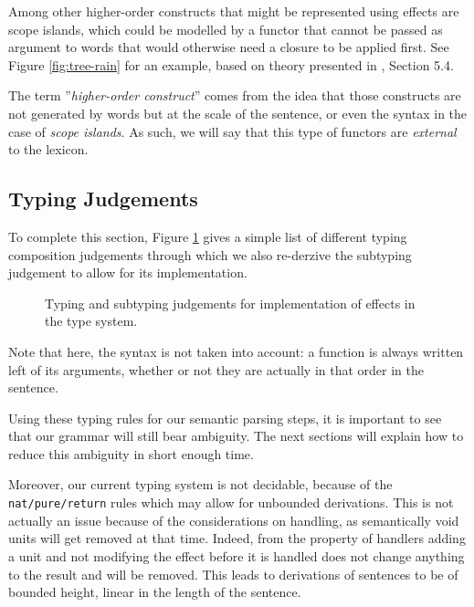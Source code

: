 Among other higher-order constructs that might be represented using effects are
scope islands, which could be modelled by a functor that cannot be
passed as argument to words that would otherwise need a closure to be applied
first.
See Figure \ref{fig:tree-rain} for an example, based on theory presented in
\cite{bumfordEffectdrivenInterpretationFunctors2025}, Section 5.4.

The term ''\emph{higher-order construct}'' comes from the idea that those
constructs are not generated by words but at the scale of the sentence, or even
the syntax in the case of \emph{scope islands}.
As such, we will say that this type of functors are \emph{external} to the
lexicon.

\subsection{Typing Judgements}\label{subsec:judgements}
To complete this section, Figure \ref{tab:judgements} gives a simple list of different typing composition judgements through which we also re-derzive the subtyping judgement to allow for its implementation.
\begin{figure}
	
	\caption{Typing and subtyping judgements for implementation of effects in the
		type system.}
	\label{tab:judgements}
\end{figure}
Note that here, the syntax is not taken into account: a function is always written left of its arguments, whether or not they are actually in that order in the sentence.

\smallskip

Using these typing rules for our semantic parsing steps, it is important to
see that our grammar will still bear ambiguity.
The next sections will explain how to reduce this ambiguity in short enough
time.

Moreover, our current typing system is not decidable, because of the
\texttt{nat/pure/return} rules which may allow for unbounded derivations.
This is not actually an issue because of the considerations on handling, as
semantically void units will get removed at that time.
Indeed, from the property of handlers adding a unit and not modifying the
effect before it is handled does not change anything to the result and will be
removed.
This leads to derivations of sentences to be of bounded height, linear in the
length of the sentence.
